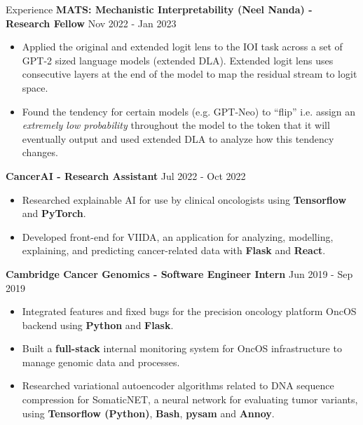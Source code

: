 \documentclass[hidelinks]{resume} %
\begin{document}
\begin{rSection}{Experience}
\textbf{MATS: Mechanistic Interpretability (Neel Nanda) - Research Fellow}
\hfill {Nov 2022 - Jan 2023}
\begin{itemize}
    \item Applied the original and extended logit lens to the IOI task across a set of GPT-2 sized language models (extended DLA). Extended logit lens uses consecutive layers at the end of the model to map the residual stream to logit space.
    \item Found the tendency for certain models (e.g. GPT-Neo) to ``flip'' i.e. assign an \textit{extremely low probability} throughout the model to the token that it will eventually output and used extended DLA to analyze how this tendency changes.
\end{itemize}

\textbf{CancerAI - Research Assistant}
\hfill {Jul 2022 - Oct 2022}
\begin{itemize}
    \item Researched explainable AI for use by clinical oncologists using \textbf{Tensorflow} and \textbf{PyTorch}.
    \item Developed front-end for VIIDA, an application for analyzing, modelling, explaining, and predicting cancer-related data with \textbf{Flask} and \textbf{React}.
\end{itemize}

\textbf{Cambridge Cancer Genomics - Software Engineer Intern}
\hfill {Jun 2019 - Sep 2019}
\begin{itemize}
    \item Integrated features and fixed bugs for the precision oncology platform OncOS backend using \textbf{Python} and \textbf{Flask}.
    \item Built a \textbf{full-stack} internal monitoring system for OncOS infrastructure to manage genomic data and processes.
    \item Researched variational autoencoder algorithms related to DNA sequence compression for SomaticNET, a neural network for evaluating tumor variants, using \textbf{Tensorflow (Python)}, \textbf{Bash}, \textbf{pysam} and \textbf{Annoy}.
\end{itemize}

\end{rSection} 
\end{document}
